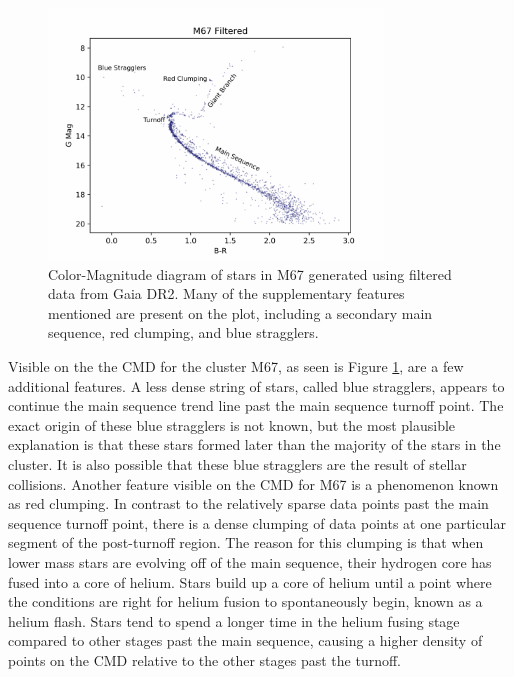 \documentclass[aps,prb,twocolumn,groupedaddress,nofootinbib,floatfix]{revtex4-1}
\begin{document}
\begin{figure}[!h]
	\centering
      \includegraphics[width=3.5in]{M67_CMD_filtered.pdf}
	\caption{Color-Magnitude diagram of stars in M67 generated using filtered data from Gaia DR2. Many of the supplementary features mentioned are present on the plot, including a secondary main sequence, red clumping, and blue stragglers.}
	\label{fig:M67_CMD_filtered}
\end{figure}

Visible on the the CMD for the cluster M67, as seen is Figure \ref{fig:M67_CMD_filtered}, are a few additional features. A less dense string of stars, called blue stragglers, appears to continue the main sequence trend line past the main sequence turnoff point. The exact origin of these blue stragglers is not known, but the most plausible explanation is that these stars formed later than the majority of the stars in the cluster. It is also possible that these blue stragglers are the result of stellar collisions. Another feature visible on the CMD for M67 is a phenomenon known as red clumping. In contrast to the relatively sparse data points past the main sequence turnoff point, there is a dense clumping of data points at one particular segment of the post-turnoff region. The reason for this clumping is that when lower mass stars are evolving off of the main sequence, their hydrogen core has fused into a core of helium. Stars build up a core of helium until a point where the conditions are right for helium fusion to spontaneously begin, known as a helium flash. Stars tend to spend a longer time in the helium fusing stage compared to other stages past the main sequence, causing a higher density of points on the CMD relative to the other stages past the turnoff.
\end{document}
